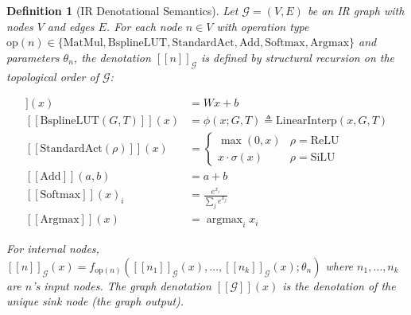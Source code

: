 \documentclass[journal,onecolumn]{IEEEtran}
\newcommand{\llbracket}{[\![}
\newcommand{\rrbracket}{]\!]}
\newtheorem{definition}{Definition}
\begin{document}
\begin{definition}[IR Denotational Semantics]
\label{def:ir_semantics}
Let $\mathcal{G} = (V, E)$ be an IR graph with nodes $V$ and edges $E$.
For each node $n \in V$ with operation type $\text{op}(n) \in \{
\text{MatMul}, \text{BsplineLUT}, \text{StandardAct}, \text{Add},
\text{Softmax}, \text{Argmax} \}$ and parameters $\theta_n$, the
denotation $\llbracket n \rrbracket_{\mathcal{G}}$ is defined by
structural recursion on the topological order of $\mathcal{G}$:

\begin{align}
\llbracket\text{MatMul}(W,b)\rrbracket(x) &= Wx + b \label{ds:matmul}\\
\llbracket\text{BsplineLUT}(G,T)\rrbracket(x) &=
\phi(x; G, T) \triangleq \text{LinearInterp}(x, G, T) \label{ds:bspline}\\
\llbracket\text{StandardAct}(\rho)\rrbracket(x) &=
\begin{cases} \max(0,x) & \rho = \text{ReLU} \\
x \cdot \sigma(x) & \rho = \text{SiLU} \end{cases} \label{ds:act}\\
\llbracket\text{Add}\rrbracket(a, b) &= a + b \label{ds:add}\\
\llbracket\text{Softmax}\rrbracket(x)_i &= \frac{e^{x_i}}{\sum_j e^{x_j}} \label{ds:softmax}\\
\llbracket\text{Argmax}\rrbracket(x) &= \operatorname{argmax}_i x_i \label{ds:argmax}
\end{align}

For internal nodes, $\llbracket n \rrbracket_{\mathcal{G}}(x) =
f_{\text{op}(n)}(\llbracket n_1 \rrbracket_{\mathcal{G}}(x), \dots,
\llbracket n_k \rrbracket_{\mathcal{G}}(x); \theta_n)$ where
$n_1,\dots,n_k$ are $n$'s input nodes. The graph denotation
$\llbracket\mathcal{G}\rrbracket(x)$ is the denotation of the unique
sink node (the graph output).
\end{definition}
\end{document}
